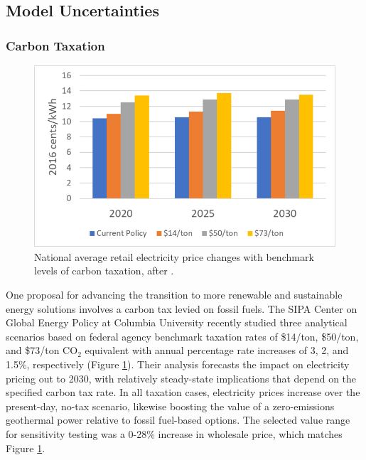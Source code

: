 \subsection{Model Uncertainties}\label{ch4:model_uncertainties}
\subsubsection{Carbon Taxation}\label{ch4:carbon_tax_uncertainty}
\begin{figure}
\centering
\includegraphics[scale=0.6]{templates/images/Figure-Carbon_Tax_Price_Impact.png}
\singlespacing
\caption[Carbon tax price impact]{National average retail electricity price changes with benchmark levels of carbon taxation, after \protect\citep[Figure\ 30]{larson_energy_2018}.}
\label{fig:carbon_tax_pricing}
\end{figure}
One proposal for advancing the transition to more renewable and sustainable energy solutions involves a carbon tax levied on fossil fuels. The SIPA Center on Global Energy Policy at Columbia University recently studied three analytical scenarios based on federal agency benchmark taxation rates of \$14/ton, \$50/ton, and \$73/ton CO$_2$ equivalent with annual percentage rate increases of 3, 2, and 1.5\%, respectively \citep{larson_energy_2018} (Figure \ref{fig:carbon_tax_pricing}). Their analysis forecasts the impact on electricity pricing out to 2030, with relatively steady-state implications that depend on the specified carbon tax rate. In all taxation cases, electricity prices increase over the present-day, no-tax scenario, likewise boosting the value of a zero-emissions geothermal power relative to fossil fuel-based options. The selected value range for sensitivity testing was a 0-28\% increase in wholesale price, which matches Figure \ref{fig:carbon_tax_pricing}.

